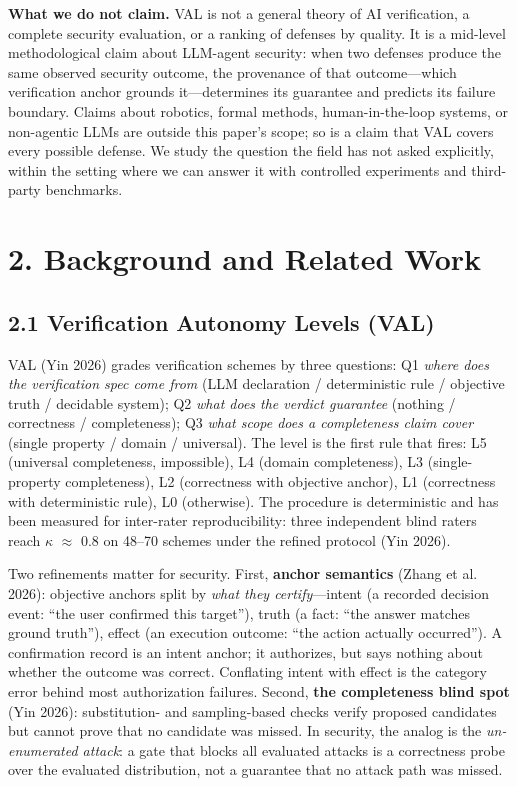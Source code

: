 \documentclass[11pt]{article}
\begin{document}
\textbf{What we do not claim.} VAL is not a general theory of AI verification, a complete security evaluation, or a ranking of defenses by quality. It is a mid-level methodological claim about LLM-agent security: when two defenses produce the same observed security outcome, the provenance of that outcome---which verification anchor grounds it---determines its guarantee and predicts its failure boundary. Claims about robotics, formal methods, human-in-the-loop systems, or non-agentic LLMs are outside this paper's scope; so is a claim that VAL covers every possible defense. We study the question the field has not asked explicitly, within the setting where we can answer it with controlled experiments and third-party benchmarks.

\section{2. Background and Related Work}\label{background-and-related-work}

\subsection{2.1 Verification Autonomy Levels (VAL)}\label{verification-autonomy-levels-val}

VAL (Yin 2026) grades verification schemes by three questions: Q1 \emph{where does the verification spec come from} (LLM declaration / deterministic rule / objective truth / decidable system); Q2 \emph{what does the verdict guarantee} (nothing / correctness / completeness); Q3 \emph{what scope does a completeness claim cover} (single property / domain / universal). The level is the first rule that fires: L5 (universal completeness, impossible), L4 (domain completeness), L3 (single-property completeness), L2 (correctness with objective anchor), L1 (correctness with deterministic rule), L0 (otherwise). The procedure is deterministic and has been measured for inter-rater reproducibility: three independent blind raters reach $\kappa$ $\approx$ 0.8 on 48--70 schemes under the refined protocol (Yin 2026).

Two refinements matter for security. First, \textbf{anchor semantics} (Zhang et al. 2026): objective anchors split by \emph{what they certify}---intent (a recorded decision event: ``the user confirmed this target''), truth (a fact: ``the answer matches ground truth''), effect (an execution outcome: ``the action actually occurred''). A confirmation record is an intent anchor; it authorizes, but says nothing about whether the outcome was correct. Conflating intent with effect is the category error behind most authorization failures. Second, \textbf{the completeness blind spot} (Yin 2026): substitution- and sampling-based checks verify proposed candidates but cannot prove that no candidate was missed. In security, the analog is the \emph{un-enumerated attack}: a gate that blocks all evaluated attacks is a correctness probe over the evaluated distribution, not a guarantee that no attack path was missed.
\end{document}

